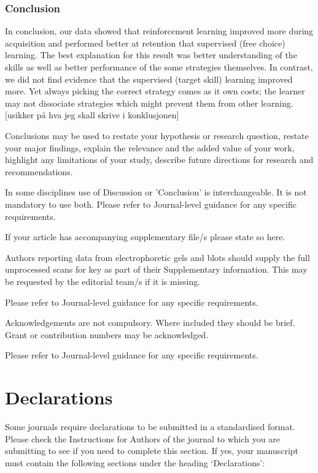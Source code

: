 \documentclass[pdflatex,sn-mathphys-num]{sn-jnl}%
\theoremstyle{thmstyleone}%
\theoremstyle{thmstyletwo}%
\theoremstyle{thmstylethree}%
\begin{document}
\subsubsection{Conclusion}

In conclusion, our data showed that reinforcement learning improved more during acquisition and performed better at retention that supervised (free choice) learning. The best explanation for this result was better understanding of the skills as well as better performance of the some strategies themselves. In contrast, we did not find evidence that the supervised (target skill) learning improved more. Yet always picking the correct strategy comes as it own costs; the learner may not dissociate strategies which might prevent them from other learning. [usikker på hva jeg skall skrive i konklusjonen]


Conclusions may be used to restate your hypothesis or research question, restate your major findings, explain the relevance and the added value of your work, highlight any limitations of your study, describe future directions for research and recommendations. 

In some disciplines use of Discussion or 'Conclusion' is interchangeable. It is not mandatory to use both. Please refer to Journal-level guidance for any specific requirements. 

\backmatter


If your article has accompanying supplementary file/s please state so here. 

Authors reporting data from electrophoretic gels and blots should supply the full unprocessed scans for key as part of their Supplementary information. This may be requested by the editorial team/s if it is missing.

Please refer to Journal-level guidance for any specific requirements.


Acknowledgements are not compulsory. Where included they should be brief. Grant or contribution numbers may be acknowledged.

Please refer to Journal-level guidance for any specific requirements.

\section*{Declarations}

Some journals require declarations to be submitted in a standardised format. Please check the Instructions for Authors of the journal to which you are submitting to see if you need to complete this section. If yes, your manuscript must contain the following sections under the heading `Declarations':
\end{document}
